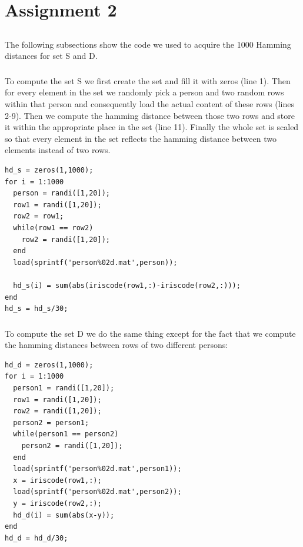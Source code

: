 \documentclass[10pt]{article}
\begin{document}
\section{Assignment 2}
\subsection{}
The following subsections show the code we used to acquire the 1000 Hamming distances for set S and D.
\subsubsection{}
To compute the set S we first create the set and fill it with zeros (line 1). Then for every element in the set we randomly pick a person and two random rows within that person and consequently load the actual content of these rows (lines 2-9). Then we compute the hamming distance between those two rows and store it within the appropriate place in the set (line 11). Finally the whole set is scaled so that every element in the set reflects the hamming distance between two elements instead of two rows.
\begin{lstlisting}[title = Code for set S]
hd_s = zeros(1,1000);
for i = 1:1000
  person = randi([1,20]);
  row1 = randi([1,20]);
  row2 = row1;
  while(row1 == row2)
    row2 = randi([1,20]);
  end
  load(sprintf('person%02d.mat',person));

  hd_s(i) = sum(abs(iriscode(row1,:)-iriscode(row2,:)));
end
hd_s = hd_s/30;
\end{lstlisting}
\subsubsection{}
To compute the set D we do the same thing except for the fact that we compute the hamming distances between rows of two different persons:
\begin{lstlisting}[title = Code for set D]
hd_d = zeros(1,1000);
for i = 1:1000
  person1 = randi([1,20]);
  row1 = randi([1,20]);
  row2 = randi([1,20]);
  person2 = person1;
  while(person1 == person2)
    person2 = randi([1,20]);
  end
  load(sprintf('person%02d.mat',person1));
  x = iriscode(row1,:);
  load(sprintf('person%02d.mat',person2));
  y = iriscode(row2,:);
  hd_d(i) = sum(abs(x-y));
end
hd_d = hd_d/30;
\end{lstlisting}
\end{document}
